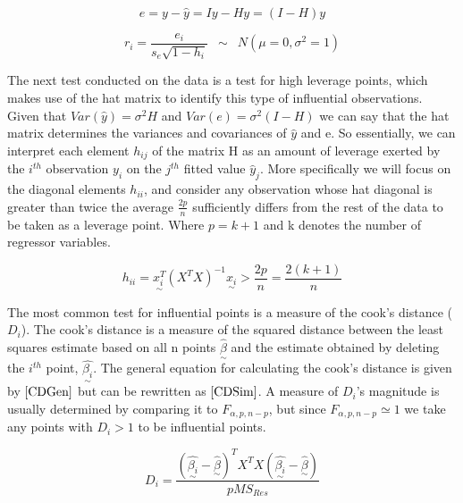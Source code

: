 \documentclass[12pt]{report}
\begin{document}
\begin{equation} \label{Res}
    e = y - \hat{y} = Iy - Hy = (I - H) y
\end{equation}

\begin{equation} \label{StdRes}
    r_i = \frac{e_i}{s_e\sqrt{1 - h_i}} \phantom{3} {\sim} \phantom{3} N(\mu = 0, \sigma^ 2 = 1)
\end{equation}

The next test conducted on the data is a test for high leverage points, which makes use of the hat matrix to identify this type of influential observations. Given that $Var(\hat{y}) = \sigma^{2}H$ and $Var(e) = \sigma^{2}(I-H)$ we can say that the hat matrix determines the variances and covariances of $\hat{y}$ and e. So essentially, we can interpret each element $h_{ij}$ of the matrix H as an amount of leverage exerted by the $i^{th}$ observation $y_{i}$ on the $j^{th}$ fitted value $\hat{y}_{j}$. More specifically we will focus on the diagonal elements $h_{ii}$, and consider any observation whose hat diagonal is greater than twice the average $\frac{2p}{n}$ sufficiently differs from the rest of the data to be taken as a leverage point. Where $p = k+1$ and k denotes the number of regressor variables.

\begin{equation} \label{HLev}
    h_{ii} = \underset{\sim}{x^{T}_{i}}(X^{T}X)^{-1}\underset{\sim}{x_{i}} > \frac{2p}{n} = \frac{2(k+1)}{n}
\end{equation}

The most common test for influential points is a measure of the cook's distance ($D_{i}$). The cook's distance is a measure of the squared distance between the least squares estimate based on all n points $\hat{\underset{\sim}\beta}$ and the estimate obtained by deleting the $i^{th}$ point, $\hat{\underset{\sim}{\beta_{i}}}$. The general equation for calculating the cook's distance is given by $\eqref{CDGen}$ but can be rewritten as $\eqref{CDSim}$. A measure of $D_{i}$'s magnitude is usually determined by comparing it to $F_{\alpha,p,n-p}$, but since $F_{\alpha,p,n-p} \simeq 1$ we take any points with $D_{i} > 1$ to be influential points.

\begin{equation} \label{CDGen}
    D_i = \frac{(\hat{\underset{\sim}{\beta_{i}}} - \hat{\underset{\sim}\beta})^{T}X^{T}X(\hat{\underset{\sim}{\beta_{i}}} - \hat{\underset{\sim}\beta})}{pMS_{Res}}
\end{equation}
\end{document}
